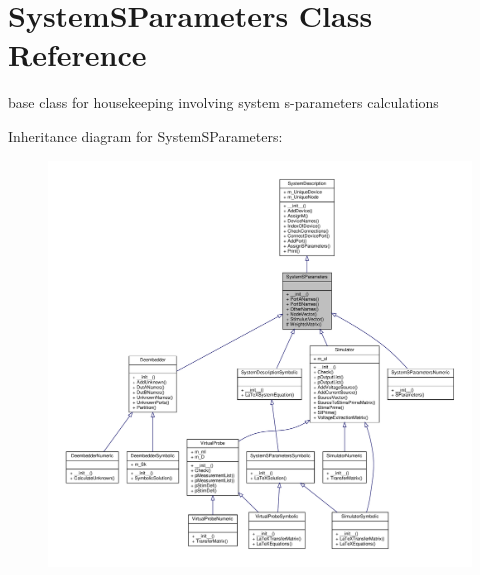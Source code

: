 \hypertarget{classSignalIntegrity_1_1SystemDescriptions_1_1SystemSParameters_1_1SystemSParameters}{}\section{System\+S\+Parameters Class Reference}
\label{classSignalIntegrity_1_1SystemDescriptions_1_1SystemSParameters_1_1SystemSParameters}


base class for housekeeping involving system s-\/parameters calculations  




Inheritance diagram for System\+S\+Parameters\+:\nopagebreak
\begin{figure}[H]
\begin{center}
\leavevmode
\includegraphics[width=350pt]{classSignalIntegrity_1_1SystemDescriptions_1_1SystemSParameters_1_1SystemSParameters__inherit__graph}
\end{center}
\end{figure}


